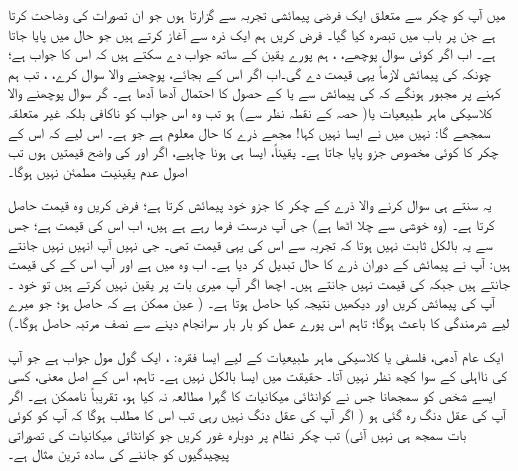 میں آپ کو  چکر سے متعلق ایک فرضی پیمائشی تجربہ سے گزارتا ہوں جو ان تصورات کی وضاحت کرتا ہے جن پر باب  میں تبصرہ کیا گیا۔ فرض کریں ہم ایک ذرہ سے آغاز کرتے ہیں جو حال میں پایا جاتا ہے۔ اب اگر کوئی سوال پوچھے، ، ہم پورے یقین کے ساتھ جواب دے سکتے ہیں کہ اس کا جواب 
  ہے؛ چونکہ  کی پیمائش لازماً یہی قیمت دے گی۔اب اگر اس کے بجائے، پوچھنے والا سوال کرے، ، تب ہم کہنے پر مجبور ہونگے کہ  کی پیمائش سے  یا  کے حصول کا احتمال آدھا آدھا ہے۔ گر سوال پوچھنے والا کلاسیکی ماہر طبیعیات 
 یا( حصہ  کے نقطہ نظر سے)  ہو تب وہ اس جواب کو ناکافی بلکہ غیر متعلقہ سمجھے گا:  نہیں میں نے ایسا نہیں کہا! مجھے ذرے کا حال  معلوم ہے جو  ہے۔  اس لیے کہ اس کے چکر کا کوئی مخصوص  جزو  پایا جاتا ہے۔ یقیناً، ایسا ہی ہونا چاہیے، اگر  اور  کی واضح قیمتیں ہوں تب اصول عدم یقینیت مطمئن نہیں ہوگا۔
 
 یہ سنتے ہی سوال کرنے والا ذرے کے چکر کا  جزو خود پیمائش کرتا ہے؛ فرض کریں وہ  قیمت حاصل کرتا ہے۔ (وہ خوشی سے چلا اٹھا ہے)  جی آپ درست فرما رہے ہے ہیں، اب اس کی  قیمت ہے؛ جس سے یہ بالکل ثابت نہیں ہوتا کہ تجربہ سے  اس کی یہی قیمت تھی۔  جی نہیں آپ انہیں نہیں جانتے ہیں: آپ نے پیمائش کے دوران ذرے کا حال تبدیل کر دیا ہے۔ اب وہ  میں ہے اور آپ اس کے  کی قیمت جانتے ہیں جبکہ  کی قیمت نہیں جانتے ہیں۔ اچھا اگر آپ میری بات پر یقین نہیں کرتے ہیں تو خود ۔ آپ  کی پیمائش کریں اور دیکھیں نتیجہ کیا حاصل ہوتا ہے۔ ( عین ممکن ہے
 کہ  حاصل ہو؛ جو میرے لیے شرمندگی کا باعث ہوگا؛ تاہم اس پورے عمل کو بار بار سرانجام دینے سے نصف مرتبہ  حاصل ہوگا۔)
 
 ایک عام آدمی، فلسفی یا کلاسیکی ماہر طبیعیات کے لیے ایسا فقرہ: ، ایک گول مول جواب ہے جو آپ کی نااہلی کے سوا کچھ نظر نہیں آتا۔ حقیقت میں ایسا بالکل نہیں ہے۔ تاہم، اس کے اصل معنی، کسی ایسے شخص کو سمجھانا جس نے کوانٹائی میکانیات کا گہرا مطالعہ نہ کیا ہو، تقریباً ناممکن ہے۔ اگر آپ کی عقل دنگ رہ گئی ہو ( اگر آپ کی عقل دنگ نہیں رہی تب اس کا مطلب ہوگا کہ آپ کو کوئی بات سمجھ ہی نہیں آئی) تب  چکر نظام پر دوبارہ غور کریں جو کوانٹائی میکانیات کی تصوراتی پیچیدگیوں کو جاننے کی سادہ ترین مثال ہے۔


